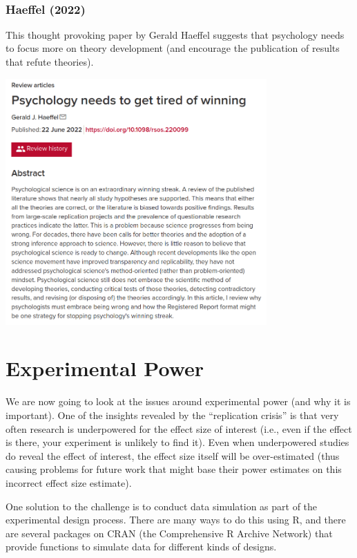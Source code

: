 \documentclass[
]{book}
\begin{document}
~~

\hypertarget{haeffel-2022}{%
\subsubsection*{Haeffel (2022)}\label{haeffel-2022}}

This thought provoking paper by Gerald Haeffel suggests that psychology needs to focus more on theory development (and encourage the publication of results that refute theories).

\href{https://royalsocietypublishing.org/doi/10.1098/rsos.220099}{\includegraphics[width=0.75\textwidth,height=\textheight]{images/haeffel.png}}

\hypertarget{experimental-power}{%
\section{Experimental Power}\label{experimental-power}}

We are now going to look at the issues around experimental power (and why it is important). One of the insights revealed by the ``replication crisis'' is that very often research is underpowered for the effect size of interest (i.e., even if the effect is there, your experiment is unlikely to find it). Even when underpowered studies do reveal the effect of interest, the effect size itself will be over-estimated (thus causing problems for future work that might base their power estimates on this incorrect effect size estimate).

One solution to the challenge is to conduct data simulation as part of the experimental design process. There are many ways to do this using R, and there are several packages on CRAN (the Comprehensive R Archive Network) that provide functions to simulate data for different kinds of designs.
\end{document}
